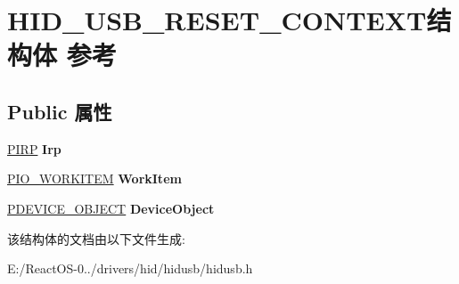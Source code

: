 \hypertarget{struct_h_i_d___u_s_b___r_e_s_e_t___c_o_n_t_e_x_t}{}\section{H\+I\+D\+\_\+\+U\+S\+B\+\_\+\+R\+E\+S\+E\+T\+\_\+\+C\+O\+N\+T\+E\+X\+T结构体 参考}
\label{struct_h_i_d___u_s_b___r_e_s_e_t___c_o_n_t_e_x_t}
\subsection*{Public 属性}
\begin{DoxyCompactItemize}
\item 
\mbox{\label{struct_h_i_d___u_s_b___r_e_s_e_t___c_o_n_t_e_x_t_a1c09428acd64468e84e971ad2d7199cd}} 
\hyperlink{interfacevoid}{P\+I\+RP} {\bfseries Irp}
\item 
\mbox{\label{struct_h_i_d___u_s_b___r_e_s_e_t___c_o_n_t_e_x_t_af34e26be615a39989f603d0279ee1052}} 
\hyperlink{struct___i_o___w_o_r_k_i_t_e_m}{P\+I\+O\+\_\+\+W\+O\+R\+K\+I\+T\+EM} {\bfseries Work\+Item}
\item 
\mbox{\label{struct_h_i_d___u_s_b___r_e_s_e_t___c_o_n_t_e_x_t_aeca7cb4828af942db16d4046eb659cf0}} 
\hyperlink{struct___d_e_v_i_c_e___o_b_j_e_c_t}{P\+D\+E\+V\+I\+C\+E\+\_\+\+O\+B\+J\+E\+CT} {\bfseries Device\+Object}
\end{DoxyCompactItemize}


该结构体的文档由以下文件生成\+:\begin{DoxyCompactItemize}
\item 
E\+:/\+React\+O\+S-\/0../drivers/hid/hidusb/hidusb.\+h\end{DoxyCompactItemize}
